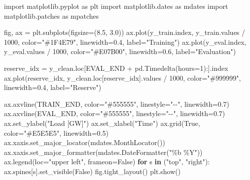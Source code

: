 \documentclass[
  english,
  letterpaper,
]{scrbook}
\newenvironment{Shaded}{\begin{snugshade}}{\end{snugshade}}
\newcommand{\ControlFlowTok}[1]{\textcolor[rgb]{0.00,0.23,0.31}{\textbf{#1}}}
\newcommand{\DecValTok}[1]{\textcolor[rgb]{0.68,0.00,0.00}{#1}}
\newcommand{\FloatTok}[1]{\textcolor[rgb]{0.68,0.00,0.00}{#1}}
\newcommand{\ImportTok}[1]{\textcolor[rgb]{0.00,0.46,0.62}{#1}}
\newcommand{\KeywordTok}[1]{\textcolor[rgb]{0.00,0.23,0.31}{\textbf{#1}}}
\newcommand{\NormalTok}[1]{\textcolor[rgb]{0.00,0.23,0.31}{#1}}
\newcommand{\OperatorTok}[1]{\textcolor[rgb]{0.37,0.37,0.37}{#1}}
\newcommand{\StringTok}[1]{\textcolor[rgb]{0.13,0.47,0.30}{#1}}
\newcommand{\VariableTok}[1]{\textcolor[rgb]{0.07,0.07,0.07}{#1}}
\begin{document}
\begin{Shaded}
\begin{Highlighting}[]
\ImportTok{import}\NormalTok{ matplotlib.pyplot }\ImportTok{as}\NormalTok{ plt}
\ImportTok{import}\NormalTok{ matplotlib.dates }\ImportTok{as}\NormalTok{ mdates}
\ImportTok{import}\NormalTok{ matplotlib.patches }\ImportTok{as}\NormalTok{ mpatches}

\NormalTok{fig, ax }\OperatorTok{=}\NormalTok{ plt.subplots(figsize}\OperatorTok{=}\NormalTok{(}\FloatTok{8.5}\NormalTok{, }\FloatTok{3.0}\NormalTok{))}
\NormalTok{ax.plot(y\_train.index, y\_train.values }\OperatorTok{/} \DecValTok{1000}\NormalTok{,}
\NormalTok{        color}\OperatorTok{=}\StringTok{"\#1F4E79"}\NormalTok{, linewidth}\OperatorTok{=}\FloatTok{0.4}\NormalTok{, label}\OperatorTok{=}\StringTok{"Training"}\NormalTok{)}
\NormalTok{ax.plot(y\_eval.index, y\_eval.values }\OperatorTok{/} \DecValTok{1000}\NormalTok{,}
\NormalTok{        color}\OperatorTok{=}\StringTok{"\#E07B00"}\NormalTok{, linewidth}\OperatorTok{=}\FloatTok{0.6}\NormalTok{, label}\OperatorTok{=}\StringTok{"Evaluation"}\NormalTok{)}

\NormalTok{reserve\_idx }\OperatorTok{=}\NormalTok{ y\_clean.loc[EVAL\_END }\OperatorTok{+}\NormalTok{ pd.Timedelta(hours}\OperatorTok{=}\DecValTok{1}\NormalTok{):].index}
\NormalTok{ax.plot(reserve\_idx, y\_clean.loc[reserve\_idx].values }\OperatorTok{/} \DecValTok{1000}\NormalTok{,}
\NormalTok{        color}\OperatorTok{=}\StringTok{"\#999999"}\NormalTok{, linewidth}\OperatorTok{=}\FloatTok{0.4}\NormalTok{, label}\OperatorTok{=}\StringTok{"Reserve"}\NormalTok{)}

\NormalTok{ax.axvline(TRAIN\_END, color}\OperatorTok{=}\StringTok{"\#555555"}\NormalTok{, linestyle}\OperatorTok{=}\StringTok{"{-}{-}"}\NormalTok{, linewidth}\OperatorTok{=}\FloatTok{0.7}\NormalTok{)}
\NormalTok{ax.axvline(EVAL\_END,  color}\OperatorTok{=}\StringTok{"\#555555"}\NormalTok{, linestyle}\OperatorTok{=}\StringTok{"{-}{-}"}\NormalTok{, linewidth}\OperatorTok{=}\FloatTok{0.7}\NormalTok{)}
\NormalTok{ax.set\_ylabel(}\StringTok{"Load [GW]"}\NormalTok{)}
\NormalTok{ax.set\_xlabel(}\StringTok{"Time"}\NormalTok{)}
\NormalTok{ax.grid(}\VariableTok{True}\NormalTok{, color}\OperatorTok{=}\StringTok{"\#E5E5E5"}\NormalTok{, linewidth}\OperatorTok{=}\FloatTok{0.5}\NormalTok{)}
\NormalTok{ax.xaxis.set\_major\_locator(mdates.MonthLocator())}
\NormalTok{ax.xaxis.set\_major\_formatter(mdates.DateFormatter(}\StringTok{"\%b \%Y"}\NormalTok{))}
\NormalTok{ax.legend(loc}\OperatorTok{=}\StringTok{"upper left"}\NormalTok{, frameon}\OperatorTok{=}\VariableTok{False}\NormalTok{)}
\ControlFlowTok{for}\NormalTok{ s }\KeywordTok{in}\NormalTok{ (}\StringTok{"top"}\NormalTok{, }\StringTok{"right"}\NormalTok{):}
\NormalTok{    ax.spines[s].set\_visible(}\VariableTok{False}\NormalTok{)}
\NormalTok{fig.tight\_layout()}
\NormalTok{plt.show()}
\end{Highlighting}
\end{Shaded}
\end{document}
